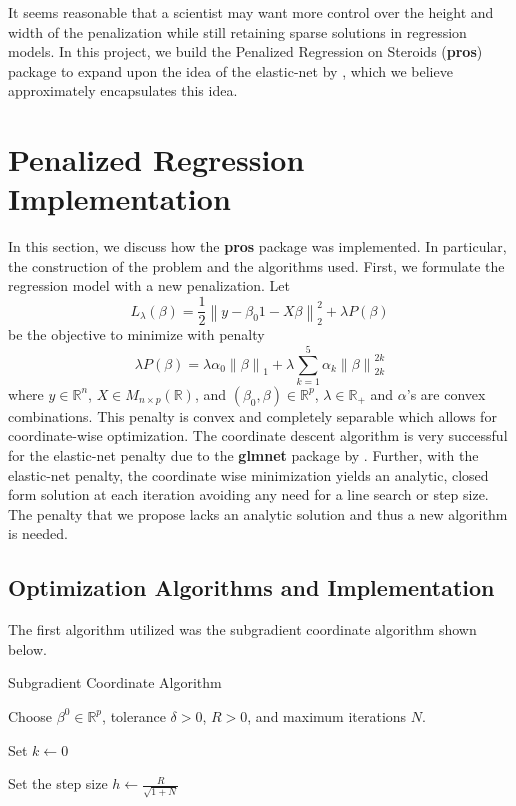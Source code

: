 \documentclass[article]{jss}
\numberwithin{equation}{section}
\newcommand{\norm}[1]{\left\lVert#1\right\rVert}
\newcommand{\R}{\mathbb{R}}
\begin{document}
It seems reasonable that a scientist may want more control over the height and width of the penalization while still retaining sparse solutions in regression models.
In this project, we build the Penalized Regression on Steroids (\textbf{pros}) package to expand upon the idea of the elastic-net by \cite{elasticnet}, which we believe approximately encapsulates this idea.

\section{Penalized Regression Implementation}

In this section, we discuss how the \textbf{pros} package was implemented. In particular, the construction of the problem and the algorithms used.
First, we formulate the regression model with a new penalization.
Let
\[
L_{\lambda}(\beta) = \frac{1}{2} \norm{y - \beta_0 1 - X \beta}_2^2 + \lambda P(\beta)
\]
be the objective to minimize with penalty
\[
\lambda P(\beta) = \lambda \alpha_0 \norm{\beta}_1 + \lambda \sum_{k = 1}^{5} \alpha_k \norm{\beta}_{2k}^{2k} 
\]
where $y \in \R^n$, $X \in M_{n \times p}(\R)$, and $(\beta_0, \beta) \in \R^p$, $\lambda \in \R_{+}$ and $\alpha$'s are convex combinations.
This penalty is convex and completely separable which allows for coordinate-wise optimization.
The coordinate descent algorithm is very successful for the elastic-net penalty due to the \textbf{glmnet} package by \cite{glmnet}.
Further, with the elastic-net penalty, the coordinate wise minimization yields an analytic, closed form solution at each iteration avoiding any need for a line search or step size.
The penalty that we propose lacks an analytic solution and thus a new algorithm is needed.

\subsection{Optimization Algorithms and Implementation}

The first algorithm utilized was the subgradient coordinate algorithm shown below.

\vspace{.2cm}
\begin{algorithm}[H]
\caption{Subgradient Coordinate Algorithm}
Choose $\beta^0 \in \R^p$, tolerance $\delta > 0$, $R > 0$, and maximum iterations $N$.

Set $k \gets 0$

Set the step size $h \gets \frac{R}{\sqrt{1 + N}}$


\end{algorithm}
\vspace{.2cm}
\end{document}
